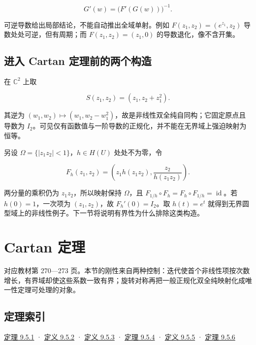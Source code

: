\documentclass[11pt,a4paper]{article}
\begin{document}
\[
G'(w)=\bigl(F'(G(w))\bigr)^{-1}.
\]

可逆导数给出局部结论，不能自动推出全域单射。例如
\(F(z_1,z_2)=(e^{z_1},z_2)\) 导数处处可逆，但有周期；而
\(F(z_1,z_2)=(z_1,0)\) 的导数退化，像不含开集。

\subsection*{进入 Cartan 定理前的两个构造}\label{ch09-s4-heading-7}

在 \(\mathbb C^2\) 上取

\[
S(z_1,z_2)=(z_1,z_2+z_1^2).
\]

其逆为
\((w_1,w_2)\mapsto(w_1,w_2-w_1^2)\)，故是非线性双全纯自同构；它固定原点且导数为
\(I_2\)。可见仅有函数值与一阶导数的正规化，并不能在无界域上强迫映射为恒等。

另设 \(\Omega=\{|z_1z_2|<1\}\)，\(h\in H(U)\) 处处不为零，令

\[
F_h(z_1,z_2)=\left(z_1h(z_1z_2),\frac{z_2}{h(z_1z_2)}\right).
\]

两分量的乘积仍为 \(z_1z_2\)，所以映射保持 \(\Omega\)，且
\(F_{1/h}\circ F_h=F_h\circ F_{1/h}=\operatorname{id}\)。若
\(h(0)=1\)，一次项为 \((z_1,z_2)\)，故 \(F_h'(0)=I_2\)。取 \(h(t)=e^t\)
就得到无界圆型域上的非线性例子。下一节将说明有界性为什么排除这类构造。

\section{Cartan 定理}
\hypertarget{chapter9-part-5}{}
\par
对应教材第 270---273
页。本节的刚性来自两种控制：迭代使首个非线性项按次数增长，有界域却使这些系数一致有界；旋转对称再把一般正规化双全纯映射化成唯一性定理可处理的对象。

\subsection*{定理索引}\label{ch09-s5-heading-1}

\hyperref[ch09-s5-heading-2]{定理 9.5.1} · \hyperref[ch09-s5-heading-3]{定义 9.5.2} ·
\hyperref[ch09-s5-heading-4]{定义 9.5.3} · \hyperref[ch09-s5-heading-5]{定理 9.5.4} ·
\hyperref[ch09-s5-heading-6]{定义 9.5.5} · \hyperref[ch09-s5-heading-7]{定理 9.5.6}
\end{document}
